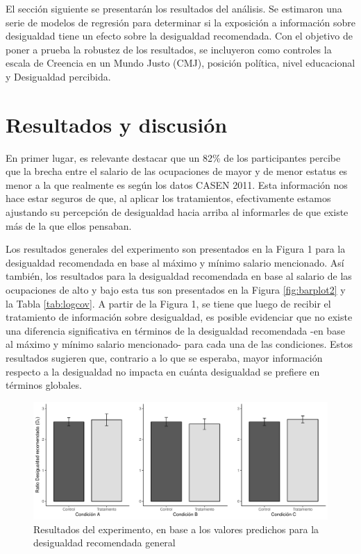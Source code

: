 \documentclass[12pt]{article}
\begin{document}
El sección siguiente se presentarán los resultados del análisis. Se estimaron una serie de modelos de regresión para determinar si la exposición a información sobre desigualdad tiene un efecto sobre la desigualdad recomendada. Con el objetivo de poner a prueba la robustez de los resultados, se incluyeron como controles la escala de Creencia en un Mundo Justo (CMJ), posición política, nivel educacional y Desigualdad percibida.  




\newpage
\section*{Resultados y discusión}



En primer lugar, es relevante destacar que un 82\% de los participantes percibe que la brecha entre el salario de las ocupaciones de mayor y de menor estatus es menor a la que realmente es según los datos CASEN 2011. Esta información nos hace estar seguros de que, al aplicar los tratamientos, efectivamente estamos ajustando su percepción de desigualdad hacia arriba al informarles de que existe más de la que ellos pensaban. 

Los resultados generales del experimento son presentados en la Figura 1 para la desigualdad recomendada en base al máximo y mínimo salario mencionado. Así también, los resultados para la desigualdad recomendada en base al salario de las ocupaciones de alto y bajo esta tus son presentados en la Figura \ref{fig:barplot2} y la Tabla \ref{tab:logcov}. A partir de la Figura 1, se tiene que luego de recibir el tratamiento de información sobre desigualdad, es posible evidenciar que no existe una diferencia significativa en términos de la desigualdad recomendada -en base al máximo y mínimo salario mencionado- para cada una de las condiciones. Estos resultados sugieren que, contrario a lo que se esperaba, mayor información respecto a la desigualdad no impacta en cuánta desigualdad se prefiere en términos globales.
   


\begin{figure}[H]	
\centering 
\includegraphics[width=0.85\linewidth]{Resultados/images/barplot1} 
\caption{Resultados del experimento, en base a los valores predichos para la desigualdad recomendada general}
\label{fig:barplot1}
\end{figure}
\end{document}
